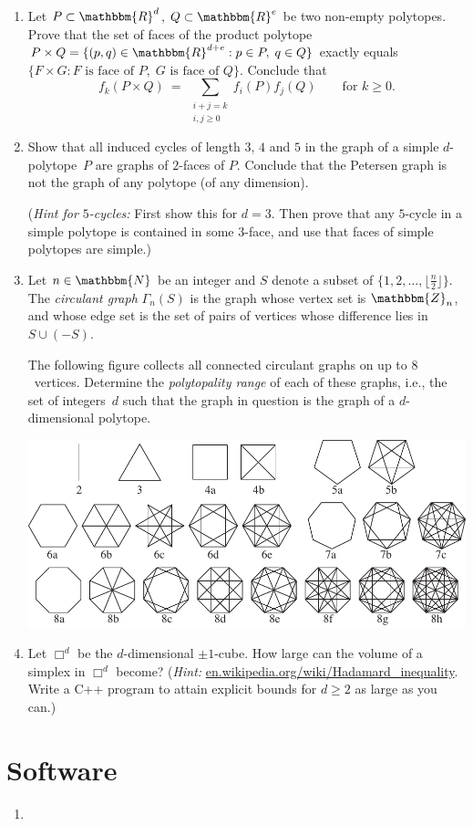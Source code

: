 \documentclass[11pt]{amsart}
\newcommand{\N}{\mathbbm{N}}
\newcommand{\R}{\mathbbm{R}}
\newcommand{\Z}{\mathbbm{Z}}
\begin{document}
\begin{enumerate}

\item Let $P\subset\R^d$, $Q\subset\R^e$ be two non-empty polytopes. Prove that the set of faces of the product polytope $P\times Q=\{(p,q)\in\R^{d+e}:p\in P,\; q\in Q\}$ exactly equals $\{F\times G: F\text{ is face of }P, \;G\text{ is face of }Q\}$. Conclude that
\[
    f_k(P\times Q)
    \ = \
    \sum_{\substack{i+j=k\\i,j\ge0}}f_i(P) f_j(Q)
    \qquad
    \text{for } k\ge0.
\]

\item Show that all induced cycles of length $3$, $4$ and $5$ in the graph of a simple $d$-polytope~$P$ are graphs of $2$-faces of $P$.
Conclude that the Petersen graph is not the graph of any polytope (of any dimension).

(\emph{Hint for $5$-cycles:} First show this for $d=3$. Then prove
that any $5$-cycle in a simple polytope is contained in some $3$-face,
and use that faces of  simple polytopes are simple.)

\item Let $n\in\N$ be an integer and $S$ denote a subset of
  $\{1,2,\dots,\lfloor\frac{n}{2}\rfloor\}$.  
  The \emph{circulant graph} $\Gamma_n(S)$ is the graph whose vertex set is $\Z_n$, and whose edge set is the set of pairs of vertices whose difference lies in $S\cup (-S)$. 

The following figure collects all connected circulant graphs on up to $8$~vertices. Determine the \emph{polytopality range} of each of these graphs, i.e., the set of integers~$d$ such that the graph in question is the graph of a $d$-dimensional polytope.

\bigskip
\includegraphics[width=\linewidth]{circulant}

\item Let $\Box^d$ be the $d$-dimensional $\pm1$-cube. How large can the volume of a simplex in $\Box^d$ become? (\emph{Hint:} \url{en.wikipedia.org/wiki/Hadamard_inequality}. Write a  C++ program to attain explicit bounds for $d\ge2$ as large as you can.)
\end{enumerate}

\bigskip
\bigskip
\section*{Software}

\begin{enumerate}
\setlength{\itemsep}{2ex}
\item
\end{enumerate}
\end{document}
